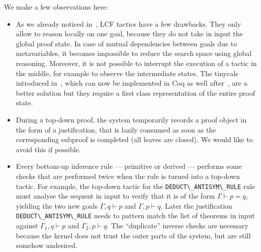 \documentclass[preprint]{sigplanconf}
\begin{document}
We make a few observations here:
\begin{itemize}
\item As we already noticed in~\cite{csc2}, LCF tactics have a few drawbacks. They only allow to reason locally on one goal, because they do not take in input the global proof state. In case of mutual dependencies between goals due to metavariables, it becomes impossible to reduce the search space using global reasoning. Moreover, it is not possible to interrupt the execution of a tactic in the middle, for example to observe the intermediate states. The tinycals introduced in~\cite{csc2}, which can now be implemented in Coq as well after~\cite{spiwack}, are a better solution but they require a first class representation of the entire proof state.
\item During a top-down proof, the system temporarily records a proof object in the form of a justification, that is lazily consumed as soon as the corresponding subproof is completed (all leaves are closed). We would like to avoid this if possible.
\item Every bottom-up inference rule --- primitive or derived --- performs some checks that are performed twice when the rule is turned into a top-down tactic.
For example, the top-down tactic for the \verb+DEDUCT\_ANTISYM\_RULE+ rule must analyse the sequent in input to verify that it is of the form $\Gamma \vdash p=q$, yielding the two new goals $\Gamma, q \vdash p$ and $\Gamma, p \vdash q$. Later the justification \verb+DEDUCT\_ANTISYM\_RULE+ needs to pattern match the list of theorems in input against $\Gamma_1,q \vdash p$ and $\Gamma_2,p \vdash q$. The ``duplicate'' inverse checks are necessary because the kernel does not trust the outer parts of the system, but are still somehow undesired.
\end{itemize}
\end{document}
